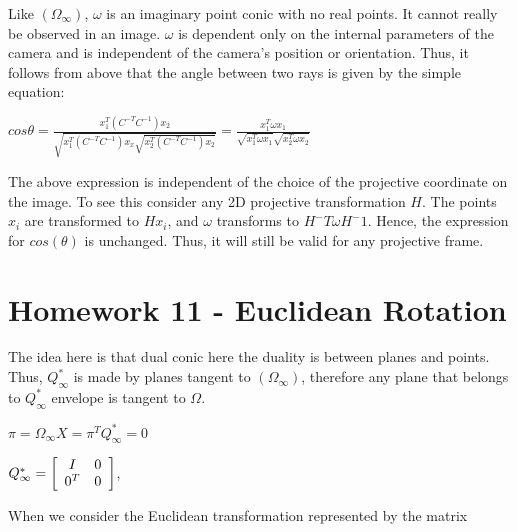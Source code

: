 \documentclass[]{article}
\begin{document}
Like  $(\Omega _ \infty)$, $\omega$ is an imaginary point conic with no real points. It cannot really be observed in an image. $\omega$ is dependent only on the internal parameters of the camera and is independent of the camera's position or orientation. Thus,
it follows from above that the angle between two rays is given by the simple equation:

\vspace{0.5em}

\centerline {
	$cos \theta = \frac{x_1^T(C^{-T}C^{-1})x_2}{\sqrt{x_1^T(C^{-T}C^{-1})x_x \sqrt{x_2^T(C^{-T}C^{-1})x_2}}} = \frac{x_1^T \omega x_1}{\sqrt{x_1^T \omega x_1} \sqrt{x_2^T \omega x_2}}$
}

\vspace{0.5em}

The above expression is independent of the choice of the projective coordinate on the image. To see this consider any 2D projective transformation $H$. The points $x_i$ are transformed to $Hx_i$, and $\omega$ transforms to $H^-T \omega H^-1$. Hence, the expression for $cos (\theta)$ is unchanged. Thus, it will still be valid for any projective frame. 


\section{Homework 11 - Euclidean Rotation}

The idea here is that dual conic here the duality is between planes and points. Thus, $Q_ \infty ^*$ is made by planes tangent to $(\Omega _ \infty)$, therefore any plane that belongs to $Q_ \infty ^*$ envelope is tangent to $\Omega$. 

\vspace{0.5em}

\centerline {
	$\pi = \Omega _ \infty X = \pi ^TQ_ \infty ^* = 0$ 
}

\vspace{0.5em}

\centerline {
	$Q_ \infty ^* = \left[ {\begin{array}{*{20}c}
		I & 0 \\
		0^T & 0   
		\end{array} } \right]$,
}

\vspace{0.5em}

When we consider the Euclidean transformation represented by the matrix 

\vspace{0.5em}
\end{document}
